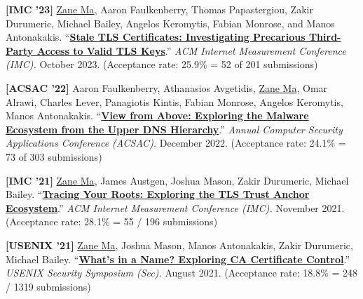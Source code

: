 \documentclass[10pt,singlecolumn]{article} %
\begin{document}
\begin{etaremune}


\item \textbf{[IMC '23]} 
\underline{Zane Ma}, Aaron Faulkenberry, Thomas Papastergiou, Zakir Durumeric, Michael Bailey, Angelos Keromytis, Fabian Monrose, and Manos Antonakakis.
``\textbf{\href{}{Stale TLS Certificates: Investigating Precarious Third-Party Access to Valid TLS Keys}}.''
\emph{ACM Internet Measurement Conference (IMC).} October 2023.
(Acceptance rate: 25.9\% = 52 of 201 submissions)
\vspace{6pt}



\item \textbf{[ACSAC '22]} 
Aaron Faulkenberry, Athanasios Avgetidis, \underline{Zane Ma}, Omar Alrawi, Charles Lever, Panagiotis Kintis, Fabian Monrose, Angelos Keromytis, Manos Antonakakis.
``\textbf{\href{https://zanema.com/papers/acsac22_authdns.pdf}{View from Above: Exploring the Malware Ecosystem from the Upper DNS Hierarchy}}.''
\emph{Annual Computer Security Applications Conference (ACSAC).} December 2022.
(Acceptance rate: 24.1\% = 73 of 303 submissions)
\vspace{6pt}



\item \textbf{[IMC '21]} 
\underline{Zane Ma}, James Austgen, Joshua Mason, Zakir Durumeric, Michael Bailey.
``\textbf{\href{https://zanema.com/papers/imc21_roots.pdf}{Tracing Your Roots: Exploring the TLS Trust Anchor Ecosystem}}.''
\emph{ACM Internet Measurement Conference (IMC).} November 2021.
(Acceptance rate: 28.1\% = 55 / 196 submissions)
\vspace{6pt}


\item \textbf{[USENIX '21]}
\underline{Zane Ma}, Joshua Mason, Manos Antonakakis, Zakir Durumeric, Michael Bailey.
``\textbf{\href{https://zanema.com/papers/usenix21_ca_operators.pdf}{What's in a Name? Exploring CA Certificate Control}}.''
\emph{USENIX Security Symposium (Sec).} August 2021.
(Acceptance rate: 18.8\% = 248 / 1319 submissions)  
\vspace{6pt}



\end{etaremune}
\end{document}
